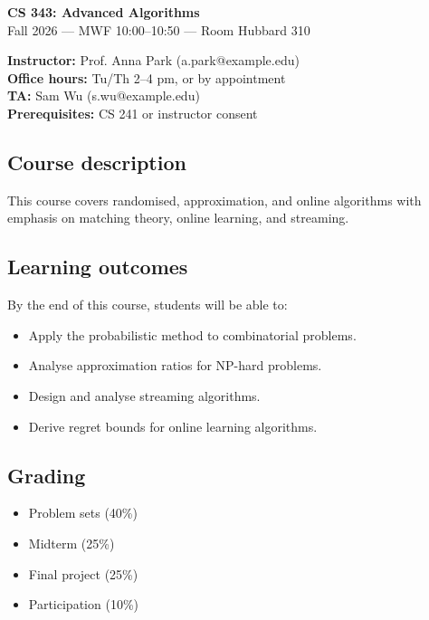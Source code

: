 \documentclass{article}
\begin{document}
\begin{center}
  {\Large\bfseries CS 343: Advanced Algorithms} \\
  Fall 2026 --- MWF 10:00--10:50 --- Room Hubbard 310
\end{center}

\vspace{0.3cm}

\noindent
\textbf{Instructor:} Prof. Anna Park (a.park@example.edu) \\
\textbf{Office hours:} Tu/Th 2--4 pm, or by appointment \\
\textbf{TA:} Sam Wu (s.wu@example.edu) \\
\textbf{Prerequisites:} CS 241 or instructor consent

\subsection*{Course description}
This course covers randomised, approximation, and online algorithms with emphasis on matching theory, online learning, and streaming.

\subsection*{Learning outcomes}
By the end of this course, students will be able to:
\begin{itemize}[noitemsep]
  \item Apply the probabilistic method to combinatorial problems.
  \item Analyse approximation ratios for NP-hard problems.
  \item Design and analyse streaming algorithms.
  \item Derive regret bounds for online learning algorithms.
\end{itemize}

\subsection*{Grading}
\begin{itemize}[noitemsep]
  \item Problem sets (40\%)
  \item Midterm (25\%)
  \item Final project (25\%)
  \item Participation (10\%)
\end{itemize}
\end{document}
